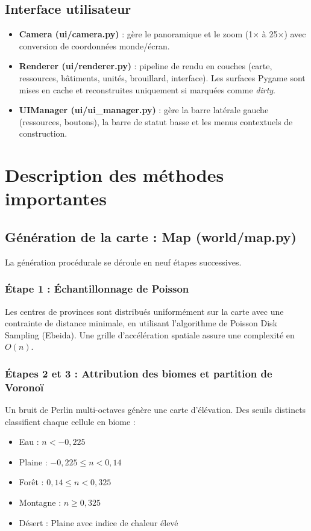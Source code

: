 \documentclass[12pt, a4paper]{article}
\begin{document}
\subsection{Interface utilisateur}

\begin{itemize}
    \item \textbf{Camera (ui/camera.py)} : gère le panoramique et le zoom (1$\times$ à 25$\times$) avec conversion de coordonnées monde/écran.
    \item \textbf{Renderer (ui/renderer.py)} : pipeline de rendu en couches (carte, ressources, bâtiments, unités, brouillard, interface). Les surfaces Pygame sont mises en cache et reconstruites uniquement si marquées comme \textit{dirty}.
    \item \textbf{UIManager (ui/ui\_manager.py)} : gère la barre latérale gauche (ressources, boutons), la barre de statut basse et les menus contextuels de construction.
\end{itemize}



\section{Description des méthodes importantes}
\label{sec:methodes}


\subsection{Génération de la carte : Map (world/map.py)}

La génération procédurale se déroule en neuf étapes successives.

\subsubsection{Étape 1 : Échantillonnage de Poisson}
Les centres de provinces sont distribués uniformément sur la carte avec une contrainte de
distance minimale, en utilisant l'algorithme de Poisson Disk Sampling (Ebeida). Une grille
d'accélération spatiale assure une complexité en $O(n)$.

\subsubsection{Étapes 2 et 3 : Attribution des biomes et partition de Voronoï}
Un bruit de Perlin multi-octaves génère une carte d'élévation. Des seuils distincts
classifient chaque cellule en biome :
\begin{itemize}
    \item Eau : $n < -0{,}225$
    \item Plaine : $-0{,}225 \leq n < 0{,}14$
    \item Forêt : $0{,}14 \leq n < 0{,}325$
    \item Montagne : $n \geq 0{,}325$
    \item Désert : Plaine avec indice de chaleur élevé
\end{itemize}
\end{document}
